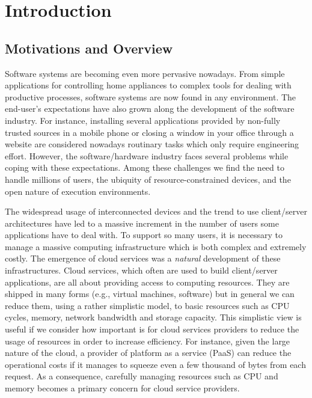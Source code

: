 

\chapter{Introduction}


\section{Motivations and Overview}

Software systems are becoming even more pervasive nowadays.
From simple applications for controlling home appliances to complex tools for dealing with productive processes, software systems are now found in any environment.
The end-user's expectations have also grown along the development of the software industry.
For instance, installing several applications provided by non-fully trusted sources in a mobile phone or closing a window in your office through a website are considered nowadays routinary  tasks which only require engineering effort.
However, the software/hardware industry faces several problems while coping with these expectations.
Among these challenges we find the need to handle millions of users, the ubiquity of resource-constrained devices, and the
open nature of execution environments.   

The widespread usage of interconnected devices and the trend to use client/server architectures have led to a massive increment in the number of users some applications have to deal with.
To support so many users, it is necessary to manage a massive computing infrastructure which is both complex and extremely costly.
The emergence of cloud services was a \textit{natural} development of these infrastructures.
Cloud services, which often are used to  build client/server applications,  are all about providing access to computing resources.
They are shipped in many forms (e.g., virtual machines, software) but in general we can reduce them, using a rather simplistic model, to basic resources such as CPU cycles, memory, network bandwidth and storage capacity.
This simplistic view is useful if we consider how important is for cloud services providers to reduce the usage of resources in order to increase efficiency.
For instance, given the large nature of the cloud, a provider of platform as a service (PaaS) can reduce the operational costs if it manages to squeeze even a few thousand of bytes from each request.
As a consequence, carefully managing resources such as CPU and memory becomes a primary concern for cloud service providers.

